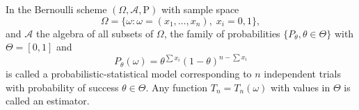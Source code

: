 In the Bernoulli scheme $(\Omega, \mathcal{A}, \mathrm{P})$ with sample space
$$
\Omega = \{\omega : \omega = (x_1, \ldots, x_n), \; x_i = 0, 1\},
$$
and $\mathcal{A}$ the algebra of all subsets of $\Omega$, the family of probabilities $\{P_\theta, \theta \in \Theta\}$ with $\Theta = [0,1]$ and
$$
P_\theta(\omega) = \theta^{\sum x_i} (1-\theta)^{n - \sum x_i}
$$
is called a probabilistic-statistical model corresponding to $n$ independent trials with probability of success $\theta \in \Theta$. Any function $T_n = T_n(\omega)$ with values in $\Theta$ is called an estimator.
